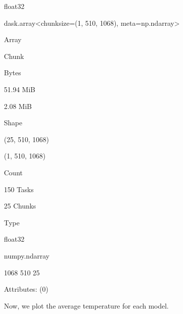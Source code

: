 \documentclass[
]{book}
\begin{document}
float32

dask.array\textless chunksize=(1, 510, 1068), meta=np.ndarray\textgreater{}

Array

Chunk

Bytes

51.94 MiB

2.08 MiB

Shape

(25, 510, 1068)

(1, 510, 1068)

Count

150 Tasks

25 Chunks

Type

float32

numpy.ndarray

1068
510
25

Attributes: {(0)}

Now, we plot the average temperature for each model.
\end{document}
